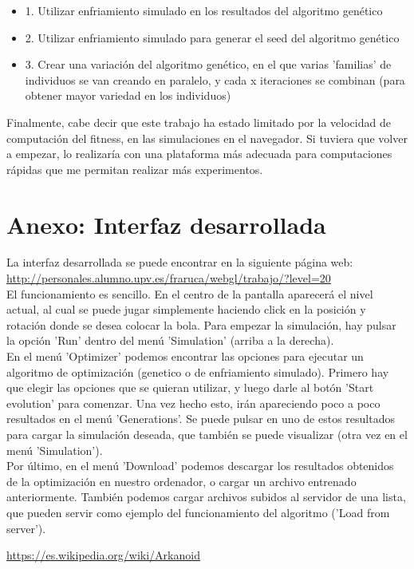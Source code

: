 \documentclass[a4paper, 11pt]{article}
\begin{document}
	\begin{itemize}
		\item 1. Utilizar enfriamiento simulado en los resultados del algoritmo genético
		\item 2. Utilizar enfriamiento simulado para generar el seed del algoritmo genético
		\item 3. Crear una variación del algoritmo genético, en el que varias 'familias' de individuos se van creando en paralelo, y cada x iteraciones se combinan (para obtener mayor variedad en los individuos)
	\end{itemize}
	
	Finalmente, cabe decir que este trabajo ha estado limitado por la velocidad de computación del fitness, en las simulaciones en el navegador. Si tuviera que volver a empezar, lo realizaría con una plataforma más adecuada para computaciones rápidas que me permitan realizar más experimentos. \\
	
	\section{Anexo: Interfaz desarrollada}
	La interfaz desarrollada se puede encontrar en la siguiente página web: \\ \href{http://personales.alumno.upv.es/fraruca/webgl/trabajo/?level=20}{http://personales.alumno.upv.es/fraruca/webgl/trabajo/?level=20} \\
	
	El funcionamiento es sencillo. En el centro de la pantalla aparecerá el nivel actual, al cual se puede jugar simplemente haciendo click en la posición y rotación donde se desea colocar la bola. Para empezar la simulación, hay pulsar la opción 'Run' dentro del menú 'Simulation' (arriba a la derecha). \\
	
	En el menú 'Optimizer' podemos encontrar las opciones para ejecutar un algoritmo de optimización (genetico o de enfriamiento simulado). Primero hay que elegir las opciones que se quieran utilizar, y luego darle al botón 'Start evolution' para comenzar. Una vez hecho esto, irán apareciendo poco a poco resultados en el menú 'Generations'. Se puede pulsar en uno de estos resultados para cargar la simulación deseada, que también se puede visualizar (otra vez en el menú 'Simulation'). \\
	
	Por último, en el menú 'Download' podemos descargar los resultados obtenidos de la optimización en nuestro ordenador, o cargar un archivo entrenado anteriormente. También podemos cargar archivos subidos al servidor de una lista, que pueden servir como ejemplo del funcionamiento del algoritmo ('Load from server').  
\begin{thebibliography}{50}
	\href{https://es.wikipedia.org/wiki/Arkanoid}{https://es.wikipedia.org/wiki/Arkanoid}
\end{thebibliography}
\end{document}
